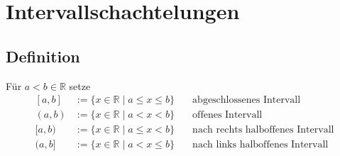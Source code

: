 \newpage

\section{Intervallschachtelungen} %
\label{sec:intervallschachtelungen}
\subsection{Definition} %
\label{sub:definition}
Für $ a < b \in \mathds{R} $ setze
\[
\begin{array}{cll}
	{[a,b]} &  := \{ x \in \mathds{R} \mid a \leq x \leq b \} \quad  & \text{abgeschlossenes Intervall} \\
	{(a,b)} &  := \{ x \in \mathds{R} \mid a < x < b \} \quad  & \text{offenes Intervall} \\
	{[a,b)} &  := \{ x \in \mathds{R} \mid a \leq x < b \} \quad  & \text{nach rechts halboffenes Intervall} \\
	{(a,b]} &  := \{ x \in \mathds{R} \mid a < x \leq b \} \quad  & \text{nach links halboffenes Intervall} \\
\end{array}
\]

